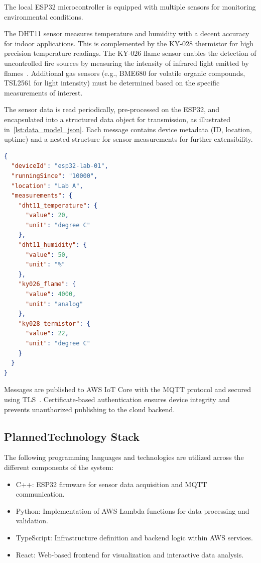 \documentclass[conference,a4paper,flushend]{cs-techrep} %
\begin{document}
The local ESP32 microcontroller is equipped with multiple sensors for monitoring environmental conditions. 

The DHT11 sensor measures temperature and humidity with a decent accuracy for indoor applications.
This is complemented by the KY-028 thermistor for high precision temperature readings.
The KY-026 flame sensor enables the detection of uncontrolled fire sources by measuring the intensity of infrared light 
emitted by flames~\cite{ky026flame}.
Additional gas sensors (e.g., BME680 for volatile organic compounds, TSL2561 for light intensity) must be determined 
based on the specific measurements of interest.

The sensor data is read periodically, pre-processed on the ESP32, and encapsulated into a structured data object 
for transmission, as illustrated in~\cref{lst:data_model_json}.
Each message contains device metadata (ID, location, uptime) and a nested structure for sensor measurements 
for further extensibility.

\begin{lstlisting}[language=json, float, caption={Example of the JSON data model for sensor value encapsulation 
    on the ESP32.}, label={lst:data_model_json}]
{
  "deviceId": "esp32-lab-01", 
  "runningSince": "10000",
  "location": "Lab A",
  "measurements": {
    "dht11_temperature": {
      "value": 20,
      "unit": "degree C"
    },
    "dht11_humidity": {
      "value": 50,
      "unit": "%"
    },
    "ky026_flame": {
      "value": 4000,
      "unit": "analog"
    },
    "ky028_termistor": {
      "value": 22,
      "unit": "degree C"
    }
  }
}
\end{lstlisting}

Messages are published to AWS IoT Core with the MQTT protocol and secured using TLS~\cite{aws}.
Certificate-based authentication ensures device integrity and prevents unauthorized publishing to the cloud backend.

\subsection{PlannedTechnology Stack}\label{sec:technology_stack}

The following programming languages and technologies are utilized across the different components of the system:

\begin{itemize}
    \item C++: ESP32 firmware for sensor data acquisition and MQTT communication.
    \item Python: Implementation of AWS Lambda functions for data processing and validation.
    \item TypeScript: Infrastructure definition and backend logic within AWS services.
    \item React: Web-based frontend for visualization and interactive data analysis.
\end{itemize}
\end{document}
